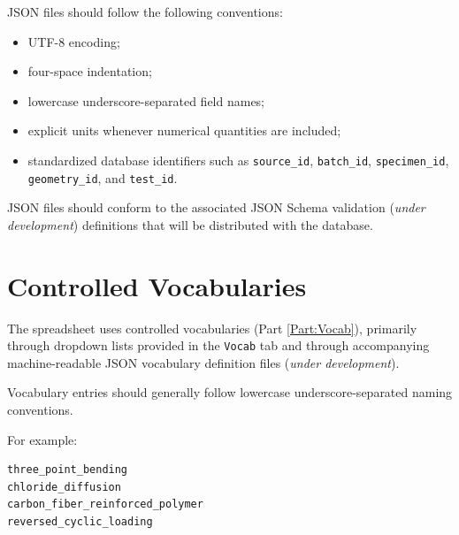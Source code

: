 \documentclass[11pt]{book}
\begin{document}
JSON files should follow the following conventions:

\begin{itemize}
    \item UTF-8 encoding;
    \item four-space indentation;
    \item lowercase underscore-separated field names;
    \item explicit units whenever numerical quantities are included;
    \item standardized database identifiers such as
    \texttt{source\_id}, \texttt{batch\_id},
    \texttt{specimen\_id}, \texttt{geometry\_id},
    and \texttt{test\_id}.
\end{itemize}

JSON files should conform to the associated
JSON Schema validation ({\emph{under development}}) definitions that will be distributed with the database.


\section{Controlled Vocabularies}
The spreadsheet uses controlled vocabularies (Part \ref{Part:Vocab}), primarily through dropdown lists provided in the \texttt{Vocab} tab and through accompanying machine-readable JSON vocabulary definition files ({\emph{under development}}).

\vspace{5mm}
\noindent
{}
\vspace{5mm}

Vocabulary entries should generally follow lowercase underscore-separated naming conventions. 

\vspace{5mm}
For example:

\begin{verbatim}
three_point_bending
chloride_diffusion
carbon_fiber_reinforced_polymer
reversed_cyclic_loading
\end{verbatim}
\end{document}

